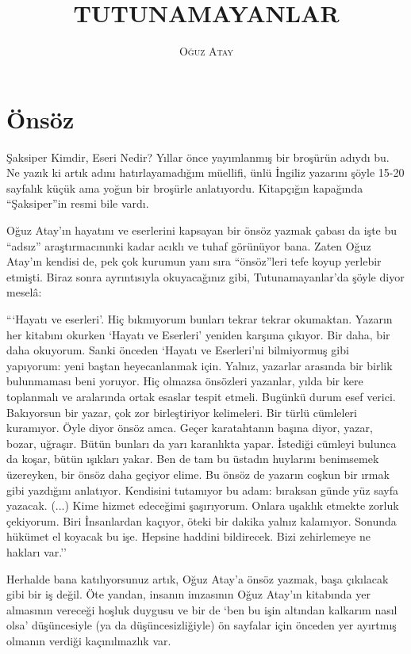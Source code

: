 \documentclass[a5paper,12pt]{scrbook}
\author{\textsc{Oğuz Atay}}
\title{TUTUNAMAYANLAR}
\date{}
\begin{document}
\maketitle

\chapter*{Önsöz}

Şaksiper Kimdir, Eseri Nedir? Yıllar önce yayımlanmış bir broşürün adıydı bu. Ne
yazık ki artık adını hatırlayamadığım müellifi, ünlü İngiliz yazarını şöyle
15-20 sayfalık küçük ama yoğun bir broşürle anlatıyordu. Kitapçığın kapağında
``Şaksiper''in resmi bile vardı.

Oğuz Atay'ın hayatını ve eserlerini kapsayan bir önsöz yazmak çabası da işte bu
``adsız'' araştırmacınınki kadar acıklı ve tuhaf görünüyor bana. Zaten Oğuz
Atay'ın kendisi de, pek çok kurumun yanı sıra ``önsöz''leri tefe koyup yerlebir
etmişti. Biraz sonra ayrıntısıyla okuyacağınız gibi, Tutunamayanlar'da şöyle
diyor meselâ:

```Hayatı ve eserleri'. Hiç bıkmıyorum bunları tekrar tekrar okumaktan. Yazarın
her kitabını okurken `Hayatı ve Eserleri' yeniden karşıma çıkıyor. Bir daha, bir
daha okuyorum. Sanki önceden `Hayatı ve Eserleri'ni bilmiyormuş gibi yapıyorum:
yeni baştan heyecanlanmak için. Yalnız, yazarlar arasında bir birlik bulunmaması
beni yoruyor. Hiç olmazsa önsözleri yazanlar, yılda bir kere toplanmalı ve
aralarında ortak esaslar tespit etmeli. Bugünkü durum esef verici. Bakıyorsun
bir yazar, çok zor birleştiriyor kelimeleri. Bir türlü cümleleri kuramıyor. Öyle
diyor önsöz amca. Geçer karatahtanın başına diyor, yazar, bozar, uğraşır. Bütün
bunları da yarı karanlıkta yapar. İstediği cümleyi bulunca da koşar, bütün
ışıkları yakar. Ben de tam bu üstadın huylarını benimsemek üzereyken, bir önsöz
daha geçiyor elime. Bu önsöz de yazarın coşkun bir ırmak gibi yazdığını
anlatıyor. Kendisini tutamıyor bu adam: bıraksan günde yüz sayfa yazacak. (...)
Kime hizmet edeceğimi şaşırıyorum. Onlara uşaklık etmekte zorluk çekiyorum. Biri
İnsanlardan kaçıyor, öteki bir dakika yalnız kalamıyor. Sonunda hükümet el
koyacak bu işe. Hepsine haddini bildirecek. Bizi zehirlemeye ne hakları var.''

Herhalde bana katılıyorsunuz artık, Oğuz Atay'a önsöz yazmak, başa çıkılacak
gibi bir iş değil. Öte yandan, insanın imzasının Oğuz Atay'ın kitabında yer
almasının vereceği hoşluk duygusu ve bir de `ben bu işin altından kalkarım nasıl
olsa' düşüncesiyle (ya da düşüncesizliğiyle) ön sayfalar için önceden yer
ayırtmış olmanın verdiği kaçınılmazlık var.
\end{document}
